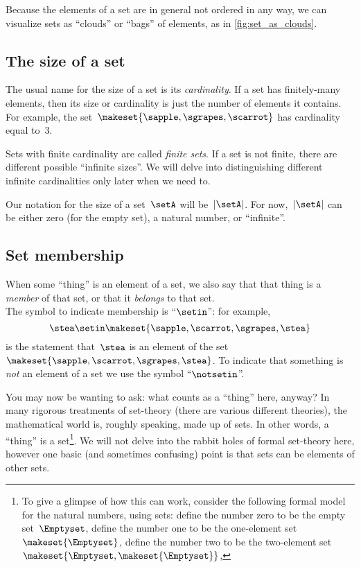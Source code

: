 Because the elements of a set are in general not ordered in any way, we can visualize sets as ``clouds'' or ``bags'' of elements, as in \cref{fig:set_as_clouds}.

\subsection{The size of a set}

The usual name for the size of a set is its \emph{cardinality}.
If a set has finitely-many elements, then its size or cardinality is just the number of elements it contains.
For example, the set~$\makeset{ \sapple, \sgrapes, \scarrot }$ has cardinality equal to~$3$.

Sets with finite cardinality are called \emph{finite sets}.
If a set is not finite, there are different possible ``infinite sizes''.
We will delve into distinguishing different infinite cardinalities only later when we need to.

Our notation for the size of a set~$\setA$ will be~$\vert \setA \vert$.
For now,~$\vert \setA \vert$ can be either zero (for the empty set), a natural number, or ``infinite''.

\subsection{Set membership}

When some ``thing'' is an element of a set, we also say that that thing is a \emph{member} of that set, or that it \emph{belongs} to that set.
\\The symbol to indicate membership is ``$\setin$'': for example,
\begin{equation}
    \stea \setin\makeset{ \sapple, \scarrot, \sgrapes, \stea }
\end{equation}
is the statement that~$\stea$ is an element of the set~$\makeset{ \sapple, \scarrot, \sgrapes, \stea }$.
To indicate that something is \emph{not} an element of a set we use the symbol ``$\notsetin$''.

You may now be wanting to ask: what counts as a ``thing'' here, anyway?
In many rigorous treatments of set-theory (there are various different theories), the mathematical world is, roughly speaking, made up of sets.
In other words, a ``thing'' is a set\footnote{
    To give a glimpse of how this can work, consider the following formal model for the natural numbers, using sets: define the number zero to be the empty set~$\Emptyset$, define the number one to be the one-element set~$\makeset{ \Emptyset }$, define the number two to be the two-element set~$\makeset{ \Emptyset, \makeset{ \Emptyset } }$, \etc }.
We will not delve into the rabbit holes of formal set-theory here, however one basic (and sometimes confusing) point is that sets can be elements of other sets.

